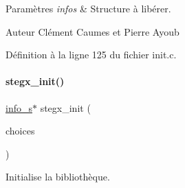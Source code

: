 \begin{DoxyParams}{Paramètres}
{\em infos} & Structure à libérer. \\
\hline
\end{DoxyParams}
\begin{DoxyAuthor}{Auteur}
Clément Caumes et Pierre Ayoub 
\end{DoxyAuthor}


Définition à la ligne 125 du fichier init.\+c.

\mbox{\label{a00107_ab6aa5e9de0fc83d5dc066f032c75c51b}} 
\paragraph{\texorpdfstring{stegx\+\_\+init()}{stegx\_init()}}
{\footnotesize\ttfamily \hyperlink{a00008_aa8ca908d92fb5bdd3c0a9e1f58b2cf03}{info\+\_\+s}$\ast$ stegx\+\_\+init (\begin{DoxyParamCaption}\item[{\hyperlink{a00008_ae5a2888ba8550edd4b6da33702b83a9d}{stegx\+\_\+choices\+\_\+s} $\ast$}]{choices }\end{DoxyParamCaption})}



Initialise la bibliothèque. 

